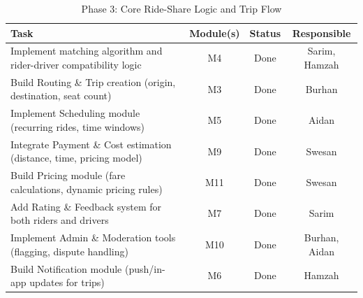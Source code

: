 \begin{table}[h!]
  \centering
  \caption{Phase 3: Core Ride-Share Logic and Trip Flow}
  \begin{tabularx}{\textwidth}{|X|c|c|c|}
  \hline
  \textbf{Task} & \textbf{Module(s)} & \textbf{Status} & \textbf{Responsible} \\
  \hline

  Implement matching algorithm and rider-driver compatibility logic 
  & M4 & Done & Sarim, Hamzah \\
  \hline

  Build Routing \& Trip creation (origin, destination, seat count) 
  & M3 & Done & Burhan \\
  \hline

  Implement Scheduling module (recurring rides, time windows) 
  & M5 & Done & Aidan \\
  \hline

  Integrate Payment \& Cost estimation (distance, time, pricing model) 
  & M9 & Done & Swesan \\
  \hline

  Build Pricing module (fare calculations, dynamic pricing rules) 
  & M11 & Done & Swesan \\
  \hline

  Add Rating \& Feedback system for both riders and drivers 
  & M7 & Done & Sarim \\
  \hline

  Implement Admin \& Moderation tools (flagging, dispute handling) 
  & M10 & Done & Burhan, Aidan \\
  \hline

  Build Notification module (push/in-app updates for trips) 
  & M6 & Done & Hamzah \\
  \hline

  \end{tabularx}
\end{table}

